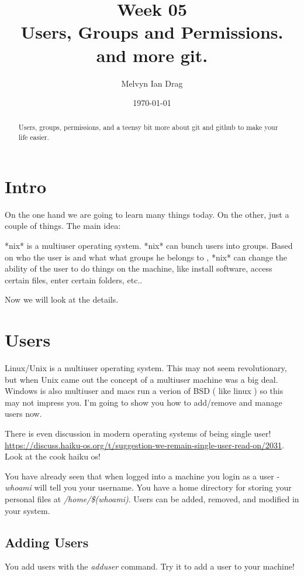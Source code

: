 \documentclass[10pt]{article}
\title{\textbf{Week 05} \\
Users, Groups and Permissions. {\small and more git. }
}
\author{
	Melvyn Ian Drag
}
\date{\today}
\begin{document}
\maketitle

\begin{abstract}
Users, groups, permissions, and a teensy bit more about git and github to make
your life easier.
\end{abstract}

\section{Intro}
On the one hand we are going to learn many things today. On the other, just a
couple of things. The main idea:

*nix* is a multiuser operating system. *nix* can bunch users into groups. Based
on who the user is and what what groups he belongs to , *nix* can change the
ability of the user to do things on the machine, like  install software, access
certain files, enter certain folders, etc..

Now we will look at the details.

\section{Users}

Linux/Unix is a multiuser operating system. This may not seem revolutionary, but when Unix came out the concept of a multiuser machine was a big deal. Windows is also multiuser and macs run a verion of BSD ( like linux ) so this may not impress you. I'm going to show you how to add/remove and manage users now.

There is even discussion in modern operating systems of being single user!
\url{https://discuss.haiku-os.org/t/suggestion-we-remain-single-user-read-on/2031}. Look at the cook haiku os!

You have already seen that when logged into a machine you login as a user -
\textit{whoami} will tell you your username. You have a home directory for
storing your personal files at \textit{/home/\$(whoami)}. Users can be added, removed, and modified in your system.

\subsection{ Adding Users }
You add users with the \textit{adduser} command. Try it to add a user to your machine!
\end{document}
